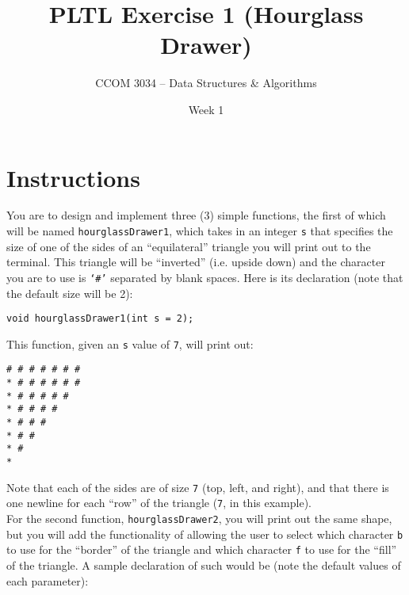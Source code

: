 \documentclass[11 pt]{article}
\title{PLTL Exercise 1 (Hourglass Drawer)}
\author{CCOM 3034 – Data Structures \& Algorithms}
\date{Week 1}
\begin{document}

\maketitle



\section{Instructions}

You are to design and implement three (3) simple functions, the first of which will be named \texttt{hourglassDrawer1}, which takes in an integer \texttt{s} that specifies the size of one of the sides of an ``equilateral'' triangle you will print out to the terminal. This triangle will be ``inverted'' (i.e. upside down) and the character you are to use is \texttt{`\#'} separated by blank spaces. Here is its declaration (note that the default size will be 2):

\begin{center}
    \texttt{void hourglassDrawer1(int s = 2);}
\end{center}

\noindent This function, given an \texttt{s} value of \texttt{7}, will print out:

\begin{center}
    \texttt{\# \# \# \# \# \# \# \\* \# \# \# \# \# \# \\*  \# \# \# \# \# \\*   \# \# \# \# \\*    \# \# \# \\*     \# \# \\*      \# \\*}
\end{center}

\noindent Note that each of the sides are of size \texttt{7} (top, left, and right), and that there is one newline for each ``row'' of the triangle (\texttt{7}, in this example). \\

\noindent For the second function, \texttt{hourglassDrawer2}, you will print out the same shape, but you will add the functionality of allowing the user to select which character \texttt{b} to use for the ``border'' of the triangle and which character \texttt{f} to use for the ``fill'' of the triangle. A sample declaration of such would be (note the default values of each parameter):
\end{document}
